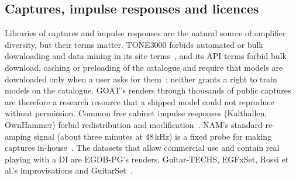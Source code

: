 \subsection{Captures, impulse responses and licences}

Libraries of captures and impulse responses are the natural source of
amplifier diversity, but their terms matter. TONE3000 forbids automated or
bulk downloading and data mining in its site terms~\cite{tone30002025terms},
and its API terms forbid bulk download, caching or preloading of the catalogue
and require that models are downloaded only when a user asks for
them~\cite{tone30002026apiterms}; neither grants a right to train models on the
catalogue. GOAT's renders through thousands of public captures are therefore a
research resource that a shipped model could not reproduce without
permission. Common free cabinet impulse responses (Kalthallen, OwnHammer)
forbid redistribution and modification~\cite{kalthallenfree,ownhammereula}.
NAM's standard re-amping signal (about three minutes at 48\,kHz) is a fixed
probe for making captures in-house~\cite{atkinsonndnam}. The datasets that
allow commercial use and contain real playing with a DI are EGDB-PG's renders,
Guitar-TECHS, EGFxSet, Rossi et al.'s improvisations and GuitarSet~\cite{xi2018guitarset}.
